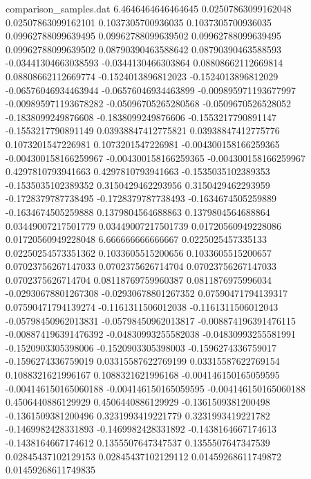 \begin{filecontents}{comparison_samples.dat}
6.4646464646464645  0.02507863099162048     0.02507863099162101     0.1037305700936035     0.1037305700936035     0.09962788099639495    0.09962788099639502    0.09962788099639495    0.09962788099639502    0.08790390463588642    0.08790390463588593    -0.03441304663038593    -0.0344130466303864     0.08808662112669814    0.08808662112669774    -0.1524013896812023     -0.1524013896812029     -0.06576046934463944    -0.06576046934463899    -0.009895971193677997   -0.009895971193678282   -0.05096705265280568    -0.0509670526528052     -0.1838099249876608     -0.1838099249876606     -0.1553217790891147     -0.1553217790891149     0.03938847412775821    0.03938847412775776    0.1073201547226981     0.1073201547226981     -0.004300158166259365   -0.004300158166259967   -0.004300158166259365   -0.004300158166259967   0.4297810793941663     0.4297810793941663     -0.1535035102389353     -0.1535035102389352     0.3150429462293956     0.3150429462293959     -0.1728379787738495     -0.1728379787738493     -0.1634674505259889     -0.1634674505259888     0.1379804564688863     0.1379804564688864     0.03449007217501779    0.03449007217501739    0.01720560949228086     0.01720560949228048   
6.666666666666667   0.0225025457335133      0.02250254573351362     0.1033605515200656     0.1033605515200657     0.07023756267147033    0.0702375626714704     0.07023756267147033    0.0702375626714704     0.08118769759960387    0.0811876975996034     -0.02930678801267308    -0.02930678801267352    0.07590471794139317    0.07590471794139274    -0.1161311506012038     -0.1161311506012043     -0.05798450962013831    -0.05798450962013817    -0.008874196391476115   -0.008874196391476392   -0.04830993255582038    -0.04830993255581991    -0.1520903305398006     -0.1520903305398003     -0.1596274336759017     -0.1596274336759019     0.03315587622769199    0.03315587622769154    0.1088321621996167     0.1088321621996168     -0.004146150165059595   -0.004146150165060188   -0.004146150165059595   -0.004146150165060188   0.4506440886129929     0.4506440886129929     -0.1361509381200498     -0.1361509381200496     0.3231993419221779     0.3231993419221782     -0.1469982428331893     -0.1469982428331892     -0.1438164667174613     -0.1438164667174612     0.1355507647347537     0.1355507647347539     0.02845437102129153    0.02845437102129112    0.01459268611749872     0.01459268611749835   

\end{filecontents}
